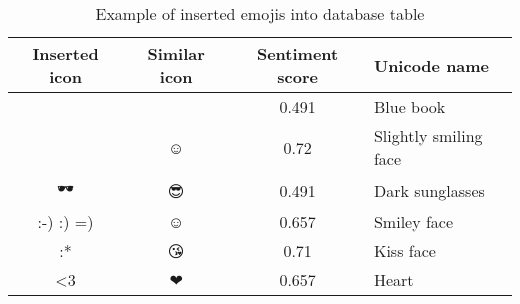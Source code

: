 \begin{table}[H]
\centering
\onehalfspacing

\begin{tabularx}{0.95\textwidth}{ c | c | c | X }
	\hline
	\textbf{Inserted icon} & \textbf{Similar icon} & \textbf{Sentiment score} & \textbf{Unicode name} \\  
 	\hline
	📘        & 📗 & 0.491 & Blue book \\
	🙂        &  ☺ & 0.72 & Slightly smiling face \\
	🕶        & 😎 & 0.491 & Dark sunglasses \\
	:-) :) =) &  ☺ & 0.657 & Smiley face \\
	:*        & 😘 & 0.71 & Kiss face \\
\textless3    & ❤  &  0.657 & Heart  \\
	\hline
\end{tabularx}

\caption{Example of inserted emojis into  database table}
\label{tab:inserted-emoticons}

\end{table}